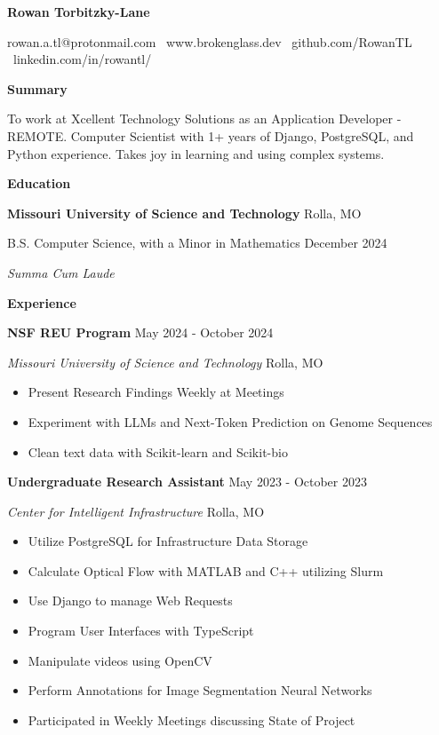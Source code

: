 \documentclass[11pt]{article}
\begin{document}
\begin{center}
    \textbf{\huge Rowan Torbitzky-Lane}\\
    \hrulefill
\end{center}

\begin{center}
    rowan.a.tl@protonmail.com \textbullet \ www.brokenglass.dev \textbullet \ github.com/RowanTL
    \textbullet \ linkedin.com/in/rowantl/
\end{center}


\begin{center}
    \textbf{Summary}
\end{center}

To work at Xcellent Technology Solutions as an Application Developer - REMOTE. Computer Scientist with 1+ years of Django, PostgreSQL, and Python experience. Takes joy in learning and using complex systems.


\begin{center}
    \textbf{Education}
\end{center}
\textbf{Missouri University of Science and Technology} \hfill Rolla, MO

B.S. Computer Science, with a Minor in Mathematics \hfill December 2024

\textit{Summa Cum Laude}

\begin{center}
    \textbf{Experience}
\end{center}

\textbf{NSF REU Program} \hfill May 2024 - October 2024

\textsl{Missouri University of Science and Technology} \hfill Rolla, MO
\begin{itemize}[noitemsep]
    \item Present Research Findings Weekly at Meetings
    \item Experiment with LLMs and Next-Token Prediction on Genome Sequences
    \item Clean text data with Scikit-learn and Scikit-bio
\end{itemize}

\textbf{Undergraduate Research Assistant} \hfill May 2023 - October 2023

\textsl{Center for Intelligent Infrastructure} \hfill Rolla, MO
\begin{itemize}[noitemsep]
    \item Utilize PostgreSQL for Infrastructure Data Storage
    \item Calculate Optical Flow with MATLAB and C++ utilizing Slurm
    \item Use Django to manage Web Requests
    \item Program User Interfaces with TypeScript
    \item Manipulate videos using OpenCV
    \item Perform Annotations for Image Segmentation Neural Networks
    \item Participated in Weekly Meetings discussing State of Project
\end{itemize}
\end{document}
